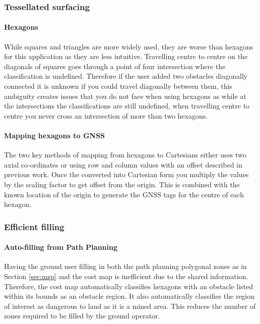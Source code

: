 \subsubsection{Tessellated surfacing}\label{sub_sub_section:tgt_hexagons}
\paragraph{Hexagons} While squares and triangles are more widely used, they are worse than hexagons for this application as they are less intuitive. Travelling centre to centre on the diagonals of squares goes through a point of four intersection where the classification is undefined. Therefore if the user added two obstacles diagonally connected it is unknown if you could travel diagonally between them, this ambiguity creates issues that you do not face when using hexagons as while at the intersections the classifications are still undefined, when travelling centre to centre you never cross an intersection of more than two hexagons.
\paragraph{Mapping hexagons to \gls{GNSS}} \label{para:Mapping hexagons}
The two key methods of mapping from hexagons to Cartesians either uses two axial co-ordinates or using row and column values with an offset described in previous work\cite{MappingHexagons}. Once the converted into Cartesian form you multiply the values by the scaling factor to get offset from the origin. This is combined with the known location of the origin to generate the \gls{GNSS} tags for the centre of each hexagon.

\subsubsection{Efficient filling}\label{sub_sub_section:tgt_filling}
\paragraph{Auto-filling from Path Planning}
Having the ground user filling in both the path planning polygonal zones as in Section \ref{sec:msp} and the cost map is inefficient due to the shared information. Therefore, the cost map automatically classifies hexagons with an obstacle listed within its bounds as an obstacle region. It also automatically classifies the region of interest as dangerous to land as it is a mined area. This reduces the number of zones required to be filled by the ground operator. 
